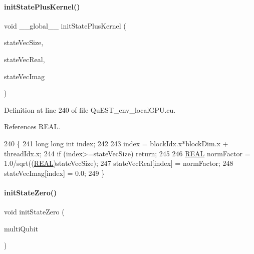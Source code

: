 \paragraph{\texorpdfstring{init\+State\+Plus\+Kernel()}{initStatePlusKernel()}}
{\footnotesize\ttfamily void \+\_\+\+\_\+global\+\_\+\+\_\+ init\+State\+Plus\+Kernel (\begin{DoxyParamCaption}\item[{long long int}]{state\+Vec\+Size,  }\item[{\mbox{\hyperlink{QuEST__precision_8h_a4b654506f18b8bfd61ad2a29a7e38c25}{R\+E\+AL}} $\ast$}]{state\+Vec\+Real,  }\item[{\mbox{\hyperlink{QuEST__precision_8h_a4b654506f18b8bfd61ad2a29a7e38c25}{R\+E\+AL}} $\ast$}]{state\+Vec\+Imag }\end{DoxyParamCaption})}



Definition at line 240 of file Qu\+E\+S\+T\+\_\+env\+\_\+local\+G\+P\+U.\+cu.



References R\+E\+AL.


\begin{DoxyCode}
240                                                                                                        \{
241     \textcolor{keywordtype}{long} \textcolor{keywordtype}{long} \textcolor{keywordtype}{int} index;
242 
243     index = blockIdx.x*blockDim.x + threadIdx.x;
244     \textcolor{keywordflow}{if} (index>=stateVecSize) \textcolor{keywordflow}{return};
245 
246     \mbox{\hyperlink{QuEST__precision_8h_a4b654506f18b8bfd61ad2a29a7e38c25}{REAL}} normFactor = 1.0/sqrt((\mbox{\hyperlink{QuEST__precision_8h_a4b654506f18b8bfd61ad2a29a7e38c25}{REAL}})stateVecSize);
247     stateVecReal[index] = normFactor;
248     stateVecImag[index] = 0.0;
249 \}
\end{DoxyCode}
\mbox{\label{QuEST__env__localGPU_8cu_a9ba8171c9ec5c42202b144026527e9ec}} 
\paragraph{\texorpdfstring{init\+State\+Zero()}{initStateZero()}}
{\footnotesize\ttfamily void init\+State\+Zero (\begin{DoxyParamCaption}\item[{\mbox{\hyperlink{structMultiQubit}{Multi\+Qubit}}}]{multi\+Qubit }\end{DoxyParamCaption})}



